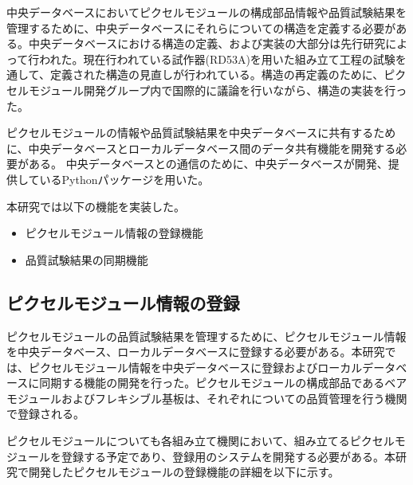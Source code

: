 中央データベースにおいてピクセルモジュールの構成部品情報や品質試験結果を管理するために、中央データベースにそれらについての構造を定義する必要がある。中央データベースにおける構造の定義、および実装の大部分は先行研究\cite{oku}によって行われた。現在行われている試作器(RD53A)を用いた組み立て工程の試験を通して、定義された構造の見直しが行われている。構造の再定義のために、ピクセルモジュール開発グループ内で国際的に議論を行いながら、構造の実装を行った。

ピクセルモジュールの情報や品質試験結果を中央データベースに共有するために、中央データベースとローカルデータベース間のデータ共有機能を開発する必要がある。
中央データベースとの通信のために、中央データベースが開発、提供しているPythonパッケージを用いた。



本研究では以下の機能を実装した。
\begin{itemize}
  \item ピクセルモジュール情報の登録機能
  \item 品質試験結果の同期機能
\end{itemize}


\subsection{ピクセルモジュール情報の登録}
\label{sec:register-module}

ピクセルモジュールの品質試験結果を管理するために、ピクセルモジュール情報を中央データベース、ローカルデータベースに登録する必要がある。本研究では、ピクセルモジュール情報を中央データベースに登録およびローカルデータベースに同期する機能の開発を行った。ピクセルモジュールの構成部品であるベアモジュールおよびフレキシブル基板は、それぞれについての品質管理を行う機関で登録される。

ピクセルモジュールについても各組み立て機関において、組み立てるピクセルモジュールを登録する予定であり、登録用のシステムを開発する必要がある。本研究で開発したピクセルモジュールの登録機能の詳細を以下に示す。


